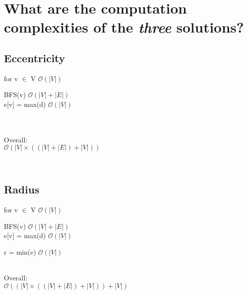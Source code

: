 \documentclass[titlepage]{article}
\begin{document}
  \section{What are the computation complexities of the \emph{three} solutions?}

  \begin{minipage}[t]{0.33\linewidth}
    \subsection{Eccentricity}
      \begin{adjustwidth}{2em}{0pt}
        for v $\in$ V \hfill $\mathcal{O} \left( |V| \right)$
        \begin{adjustwidth}{1em}{0pt}
          BFS(v) \hfill $\mathcal{O} \left( |V| + |E| \right)$\\
          e[v] = max(d) \hfill $\mathcal{O} \left( |V| \right)$
        \end{adjustwidth}
        \ \\
        \ \\
        Overall: \\

        $ \mathcal{O} \left( |V| \times \left( \left( |V| + |E| \right) + |V| \right) \right)$
      \end{adjustwidth}
  \end{minipage}
\
  \begin{minipage}[t]{0.33\linewidth}
    \subsection{Radius}
      \begin{adjustwidth}{2em}{0pt}
      for v $\in$ V \hfill $\mathcal{O} \left( |V| \right)$
      \begin{adjustwidth}{1em}{0pt}
        BFS(v) \hfill $\mathcal{O} \left( |V| + |E| \right)$\\
        e[v] = max(d) \hfill $\mathcal{O} \left( |V| \right)$
        \end{adjustwidth}
        r = min(e) \hfill $\mathcal{O} \left( |V| \right)$
      \end{adjustwidth}
      \ \\
      Overall: \\

      $ \mathcal{O} \left( \left(|V| \times \left( \left( |V| + |E| \right) + |V| \right) \right) + |V| \right)$
  \end{minipage}
\
\end{document}
